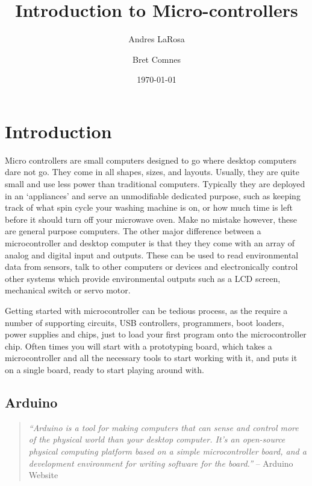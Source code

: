 \documentclass[11pt,a4paper]{article}
\begin{document}
\title{Introduction to Micro-controllers}
\date{\today} 
\author{Andres LaRosa}
\author{Bret Comnes}
\maketitle

\section{Introduction} %
\label{sec:introduction}

Micro controllers are small computers designed to go where desktop computers dare not go.  They come in all shapes, sizes, and layouts.  Usually, they are quite small and use less power than traditional computers.  Typically they are deployed in an `appliances' and serve an unmodifiable dedicated purpose, such as keeping track of what spin cycle your washing machine is on, or how much time is left before it should turn off your microwave oven.  Make no mistake however, these are general purpose computers.  The other major difference between a microcontroller and desktop computer is that they they come with an array of analog and digital input and outputs. These can be used to read environmental data from sensors, talk to other computers or devices and electronically control other systems which provide environmental outputs such as a LCD screen, mechanical switch or servo motor.  \cite{wpmicro}

Getting started with microcontroller can be tedious process, as the require a number of supporting circuits, USB controllers, programmers, boot loaders, power supplies and chips, just to load your first program onto the microcontroller chip.  Often times you will start with a prototyping board, which takes a microcontroller and all the necessary tools to start working with it, and puts it on a single board, ready to start playing around with.

\subsection{Arduino} %
\label{sub:arduino}

\begin{quote}
\emph{``Arduino is a tool for making computers that can sense and control more of the physical world than your desktop computer. It's an open-source physical computing platform based on a simple microcontroller board, and a development environment for writing software for the board.''} -- Arduino Website\cite{arduino-guide}
\end{quote}
\end{document}
